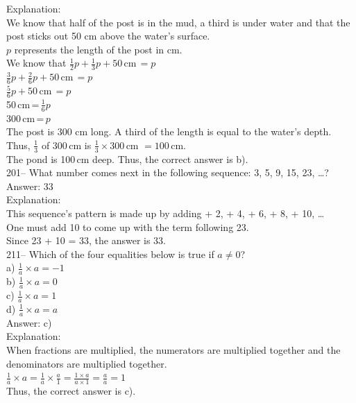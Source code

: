 \documentclass[letterpaper, 12pt]{article}
\begin{document}
Explanation: \\
We know that half of the post is in the mud, a third is under water and that the post sticks out 50 cm above the water's surface.\\[2mm]
$p$ represents the length of the post in cm.\\[2mm]
We know that $\frac{1}{2}p+\frac{1}{3}p+50$\,cm$\,=p$\\[2mm]
$\frac{3}{6}p+\frac{2}{6}p+50$\,cm$\,=p$\\[2mm]
$\frac{5}{6}p+50$\,cm$\,=p$\\[2mm]
50\,cm\,=\,$\frac{1}{6}p$\\[2mm]
300\,cm\,=\,$p$\\[2mm]
The post is 300 cm long. A third of the length is equal to the water's depth.\\
Thus, $\frac{1}{3}$ of 300\,cm is $\frac{1}{3}\times300$\,cm $=100$\,cm.\\
The pond is 100\,cm deep. Thus, the correct answer is b).\\


201-- What number comes next in the following sequence: 3, 5, 9, 15, 23, \ldots?\\

Answer: 33\\

Explanation: \\
This sequence's pattern is made up by adding + 2, + 4, + 6, + 8, + 10, \ldots\\
One must add 10 to come up with the term following 23.  \\
Since 23 + 10 = 33, the answer is 33.\\


211-- Which of the four equalities below is true if $a\neq 0$?\\
a) $\frac{1}{a}\times a = -1$\\[2mm]
b) $\frac{1}{a}\times a =0$\\[2mm]
c) $\frac{1}{a}\times a=1$\\[2mm]
d) $\frac{1}{a}\times a = a$\\

Answer: c)\\

Explanation: \\
When fractions are multiplied, the numerators are multiplied together and the denominators are multiplied together.  \\
$\frac{1}{a}\times a = \frac{1}{a} \times \frac {a}{1} = \frac{1\times
a}{a\times 1}=\frac{a}{a}=1$\\
Thus, the correct answer is c).\\
\end{document}
